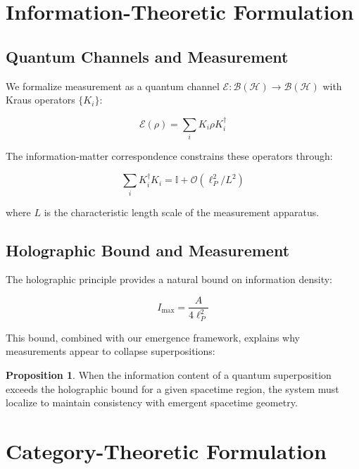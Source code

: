 \documentclass[12pt,a4paper]{article}
\theoremstyle{definition}
\newtheorem{proposition}[theorem]{Proposition}
\begin{document}
\section{Information-Theoretic Formulation}

\subsection{Quantum Channels and Measurement}

We formalize measurement as a quantum channel $\mathcal{E}: \mathcal{B}(\mathcal{H}) \rightarrow \mathcal{B}(\mathcal{H})$ with Kraus operators $\{K_i\}$:

\begin{equation}
\mathcal{E}(\rho) = \sum_i K_i \rho K_i^\dagger
\end{equation}

The information-matter correspondence constrains these operators through:

\begin{equation}
\sum_i K_i^\dagger K_i = \mathbb{I} + \mathcal{O}(\ell_P^2/L^2)
\end{equation}

where $L$ is the characteristic length scale of the measurement apparatus.

\subsection{Holographic Bound and Measurement}

The holographic principle provides a natural bound on information density:

\begin{equation}
I_{\text{max}} = \frac{A}{4\ell_P^2}
\end{equation}

This bound, combined with our emergence framework, explains why measurements appear to collapse superpositions:

\begin{proposition}
When the information content of a quantum superposition exceeds the holographic bound for a given spacetime region, the system must localize to maintain consistency with emergent spacetime geometry.
\end{proposition}

\section{Category-Theoretic Formulation}
\end{document}
